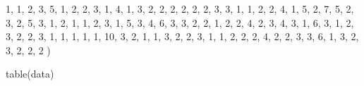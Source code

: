 \documentclass[
]{book}
\newenvironment{Shaded}{\begin{snugshade}}{\end{snugshade}}
\newcommand{\DecValTok}[1]{\textcolor[rgb]{0.00,0.00,0.81}{#1}}
\newcommand{\FunctionTok}[1]{\textcolor[rgb]{0.00,0.00,0.00}{#1}}
\newcommand{\NormalTok}[1]{#1}
\theoremstyle{definition}
\theoremstyle{definition}
\theoremstyle{definition}
\theoremstyle{definition}
\theoremstyle{remark}
\begin{document}
\begin{Shaded}
\begin{Highlighting}[]
  \DecValTok{1}\NormalTok{, }\DecValTok{1}\NormalTok{, }\DecValTok{2}\NormalTok{, }\DecValTok{3}\NormalTok{, }\DecValTok{5}\NormalTok{, }\DecValTok{1}\NormalTok{, }\DecValTok{2}\NormalTok{, }\DecValTok{2}\NormalTok{, }\DecValTok{3}\NormalTok{,  }\DecValTok{1}\NormalTok{, }\DecValTok{4}\NormalTok{, }\DecValTok{1}\NormalTok{, }\DecValTok{3}\NormalTok{, }\DecValTok{2}\NormalTok{,  }\DecValTok{2}\NormalTok{, }\DecValTok{2}\NormalTok{, }\DecValTok{2}\NormalTok{, }\DecValTok{2}\NormalTok{, }\DecValTok{2}\NormalTok{, }\DecValTok{3}\NormalTok{, }
  \DecValTok{3}\NormalTok{, }\DecValTok{1}\NormalTok{, }\DecValTok{1}\NormalTok{, }\DecValTok{2}\NormalTok{, }\DecValTok{2}\NormalTok{, }\DecValTok{4}\NormalTok{, }\DecValTok{1}\NormalTok{, }\DecValTok{5}\NormalTok{, }\DecValTok{2}\NormalTok{,  }\DecValTok{7}\NormalTok{, }\DecValTok{5}\NormalTok{, }\DecValTok{2}\NormalTok{, }\DecValTok{3}\NormalTok{, }\DecValTok{2}\NormalTok{,  }\DecValTok{5}\NormalTok{, }\DecValTok{3}\NormalTok{, }\DecValTok{1}\NormalTok{, }\DecValTok{2}\NormalTok{, }\DecValTok{1}\NormalTok{, }\DecValTok{1}\NormalTok{, }
  \DecValTok{2}\NormalTok{, }\DecValTok{3}\NormalTok{, }\DecValTok{1}\NormalTok{, }\DecValTok{5}\NormalTok{, }\DecValTok{3}\NormalTok{, }\DecValTok{4}\NormalTok{, }\DecValTok{6}\NormalTok{, }\DecValTok{3}\NormalTok{, }\DecValTok{3}\NormalTok{,  }\DecValTok{2}\NormalTok{, }\DecValTok{2}\NormalTok{, }\DecValTok{1}\NormalTok{, }\DecValTok{2}\NormalTok{, }\DecValTok{2}\NormalTok{,  }\DecValTok{4}\NormalTok{, }\DecValTok{2}\NormalTok{, }\DecValTok{3}\NormalTok{, }\DecValTok{4}\NormalTok{, }\DecValTok{3}\NormalTok{, }\DecValTok{1}\NormalTok{, }
  \DecValTok{6}\NormalTok{, }\DecValTok{3}\NormalTok{, }\DecValTok{1}\NormalTok{, }\DecValTok{2}\NormalTok{, }\DecValTok{3}\NormalTok{, }\DecValTok{2}\NormalTok{, }\DecValTok{2}\NormalTok{, }\DecValTok{3}\NormalTok{, }\DecValTok{1}\NormalTok{,  }\DecValTok{1}\NormalTok{, }\DecValTok{1}\NormalTok{, }\DecValTok{1}\NormalTok{, }\DecValTok{1}\NormalTok{, }\DecValTok{10}\NormalTok{, }\DecValTok{3}\NormalTok{, }\DecValTok{2}\NormalTok{, }\DecValTok{1}\NormalTok{, }\DecValTok{1}\NormalTok{, }\DecValTok{3}\NormalTok{, }\DecValTok{2}\NormalTok{, }
  \DecValTok{2}\NormalTok{, }\DecValTok{3}\NormalTok{, }\DecValTok{1}\NormalTok{, }\DecValTok{1}\NormalTok{, }\DecValTok{2}\NormalTok{, }\DecValTok{2}\NormalTok{, }\DecValTok{2}\NormalTok{, }\DecValTok{4}\NormalTok{, }\DecValTok{2}\NormalTok{,  }\DecValTok{2}\NormalTok{, }\DecValTok{3}\NormalTok{, }\DecValTok{3}\NormalTok{, }\DecValTok{6}\NormalTok{, }\DecValTok{1}\NormalTok{,  }\DecValTok{3}\NormalTok{, }\DecValTok{2}\NormalTok{, }\DecValTok{3}\NormalTok{, }\DecValTok{2}\NormalTok{, }\DecValTok{2}\NormalTok{, }\DecValTok{2}
\NormalTok{  )}

\FunctionTok{table}\NormalTok{(data)}
\end{Highlighting}
\end{Shaded}
\end{document}
